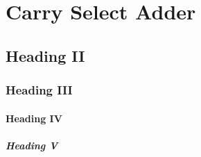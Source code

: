 \section{Carry Select Adder}
\subsection{Heading II}
\subsubsection{Heading III}
\paragraph{Heading IV}
\subparagraph{Heading V}

